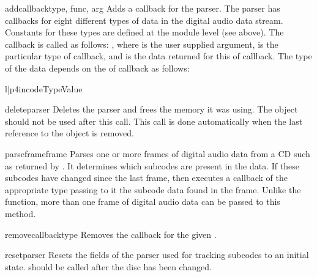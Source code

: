 \begin{methoddesc}[CD parser]{addcallback}{type, func, arg}
Adds a callback for the parser.  The parser has callbacks for eight
different types of data in the digital audio data stream.  Constants
for these types are defined at the  module level (see above).
The callback is called as follows: , where  is the user supplied argument,  is
the particular type of callback, and  is the data returned
for this  of callback.  The type of the data depends on the
 of callback as follows:

\begin{tableii}{l|p{4in}}{code}{Type}{Value}
\end{tableii}
\end{methoddesc}

\begin{methoddesc}[CD parser]{deleteparser}{}
Deletes the parser and frees the memory it was using.  The object
should not be used after this call.  This call is done automatically
when the last reference to the object is removed.
\end{methoddesc}

\begin{methoddesc}[CD parser]{parseframe}{frame}
Parses one or more frames of digital audio data from a CD such as
returned by .  It determines which subcodes are
present in the data.  If these subcodes have changed since the last
frame, then  executes a callback of the
appropriate type passing to it the subcode data found in the frame.
Unlike the \C{} function, more than one frame of digital audio data
can be passed to this method.
\end{methoddesc}

\begin{methoddesc}[CD parser]{removecallback}{type}
Removes the callback for the given .
\end{methoddesc}

\begin{methoddesc}[CD parser]{resetparser}{}
Resets the fields of the parser used for tracking subcodes to an
initial state.   should be called after the disc
has been changed.
\end{methoddesc}

